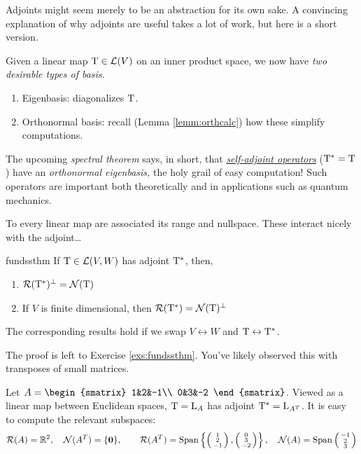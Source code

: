 
Adjoints might seem merely to be an abstraction for its own sake. A convincing explanation of why adjoints are useful takes a lot of work, but here is a short version.\smallbreak

Given a linear map $\mathrm{T}\in\mathcal{L}(V)$ on an inner product space, we now have \emph{two desirable types of basis.}
\begin{enumerate}
  \item Eigenbasis: diagonalizes $\mathrm{T}$.
  \item Orthonormal basis: recall (Lemma \ref{lemm:orthcalc}) how these simplify computations.
\end{enumerate}
The upcoming \emph{spectral theorem} says, in short, that \emph{\href{https://en.wikipedia.org/wiki/self-adjoint_operator}{self-adjoint operators}} ($\mathrm{T}^*=\mathrm{T}$) have an \emph{orthonormal eigenbasis,} the holy grail of easy computation! Such operators are important both theoretically and in applications such as quantum mechanics.


\pagebreak[3]



To every linear map are associated its range and nullspace. These interact nicely with the adjoint\ldots

\begin{thm}{}{fundssthm}
	If $\mathrm{T}\in\mathcal{L}(V,W)$ has adjoint $\mathrm{T}^*$, then,
  \begin{enumerate}
    \item $\mathcal{R}(\mathrm{T}^*)^\perp=\mathcal{N}(\mathrm{T})$
    \item If $V$ is finite dimensional, then $\mathcal{R}(\mathrm{T}^*)=\mathcal{N}(\mathrm{T})^\perp$
  \end{enumerate}
  The corresponding results hold if we swap $V\leftrightarrow W$ and $\mathrm{T}\leftrightarrow \mathrm{T}^*$.
\end{thm}

The proof is left to Exercise \ref{exs:fundssthm}. You've likely observed this with transposes of small matrices.

\begin{example}{}{}
	Let $A=
	\begin{smatrix}
		1&2&-1\\
		0&3&-2
	\end{smatrix}$.
	Viewed as a linear map between Euclidean spaces, $\mathrm{T}=\mathrm{L}_A$ has adjoint $\mathrm{T}^*=\mathrm{L}_{A^T}$. It is easy to compute the relevant subspaces:
	\begin{gather*}
		\mathcal{R}(A)=\mathbb{R}^2,\quad \mathcal{N}(A^T)=\{\mathbf{0}\},\qquad 
		\mathcal{R}(A^T)=\operatorname{Span}\left\{\left(\begin{smallmatrix}1\\2\\-1\end{smallmatrix}\right),\left(\begin{smallmatrix}0\\3\\-2\end{smallmatrix}\right)\right\},\quad 
		\mathcal{N}(A)=\operatorname{Span}\left(\begin{smallmatrix}-1\\2\\3\end{smallmatrix}\right)
	\end{gather*}
\end{example}


